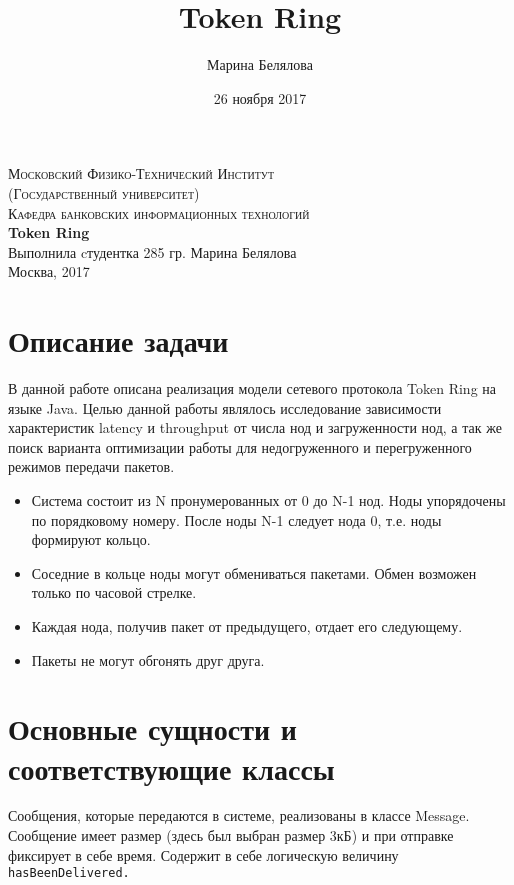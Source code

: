 \documentclass{article}
\title{Token Ring}
\author{Марина Белялова}
\date{26 ноября 2017}
\begin{document}
\begin{center}


\textsc{\Large Московский Физико-Технический Институт \\ (Государственный университет)}\\[1cm]
\textsc{\normalsize Кафедра банковских информационных технологий}\\[4cm]
{ \huge \bfseries Token Ring \\[1cm] }
\textnormal{\normalsize Выполнила cтудентка 285 гр. Марина Белялова}\\[10cm]
\textnormal{Москва, 2017}
\end{center}


\newpage

\tableofcontents

\newpage
\section{Описание задачи}
В данной работе описана реализация модели сетевого протокола Token Ring на языке Java. Целью данной работы являлось исследование зависимости характеристик latency и throughput от числа нод и загруженности нод, а так же поиск варианта оптимизации работы для недогруженного и перегруженного режимов передачи пакетов.

\begin{itemize}
\item Система состоит из N пронумерованных от 0 до N-1 нод. Ноды упорядочены по порядковому номеру. После ноды N-1 следует нода 0, т.е. ноды формируют кольцо. 
\item Соседние в кольце ноды могут обмениваться пакетами. Обмен возможен только по часовой стрелке. 
\item Каждая нода, получив пакет от предыдущего, отдает его следующему.
\item Пакеты не могут обгонять друг друга.
\end{itemize}

\section{Основные сущности и соответствующие классы}
Сообщения, которые передаются в системе, реализованы в классе Message. Сообщение имеет размер (здесь был выбран размер 3кБ) и при отправке фиксирует в себе время. Содержит в себе логическую величину
\lstinline|hasBeenDelivered.|
\end{document}
